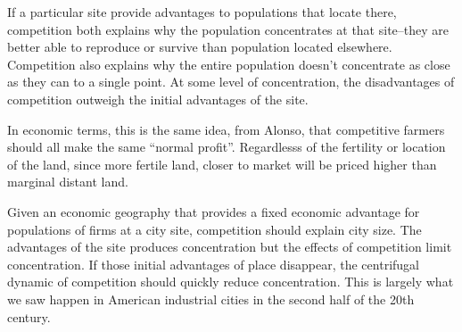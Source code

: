If a particular site provide advantages to populations that locate
there, competition both explains why the population concentrates at
that site--they are better able to reproduce or survive than
population located elsewhere. Competition also explains why the entire
population doesn't concentrate as close as they can to a single
point. At some level of concentration, the disadvantages of competition
outweigh the initial advantages of the site.

In economic terms, this is the same idea, from Alonso, that
competitive farmers should all make the same ``normal profit''.
Regardlesss of the fertility or location of the land, since more
fertile land, closer to market will be priced higher than marginal
distant land.

Given an economic geography that provides a fixed economic advantage
for populations of firms at a city site, competition should explain
city size. The advantages of the site produces concentration but the
effects of competition limit concentration. If those initial
advantages of place disappear, the centrifugal dynamic of competition
should quickly reduce concentration. This is largely what we saw
happen in American industrial cities in the second half of the 20th century.
